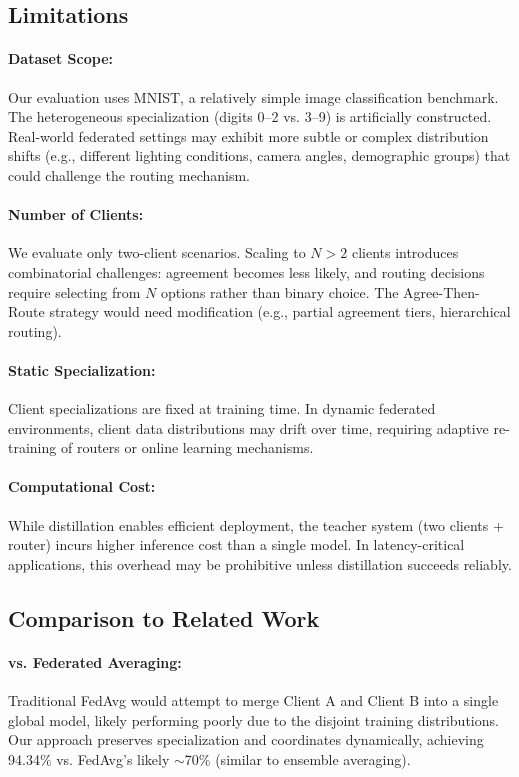 \documentclass[12pt]{article}
\begin{document}
\subsection{Limitations}

\paragraph{Dataset Scope:}
Our evaluation uses MNIST, a relatively simple image classification benchmark. The heterogeneous specialization (digits 0--2 vs. 3--9) is artificially constructed. Real-world federated settings may exhibit more subtle or complex distribution shifts (e.g., different lighting conditions, camera angles, demographic groups) that could challenge the routing mechanism.

\paragraph{Number of Clients:}
We evaluate only two-client scenarios. Scaling to $N > 2$ clients introduces combinatorial challenges: agreement becomes less likely, and routing decisions require selecting from $N$ options rather than binary choice. The Agree-Then-Route strategy would need modification (e.g., partial agreement tiers, hierarchical routing).

\paragraph{Static Specialization:}
Client specializations are fixed at training time. In dynamic federated environments, client data distributions may drift over time, requiring adaptive re-training of routers or online learning mechanisms.

\paragraph{Computational Cost:}
While distillation enables efficient deployment, the teacher system (two clients + router) incurs higher inference cost than a single model. In latency-critical applications, this overhead may be prohibitive unless distillation succeeds reliably.

\subsection{Comparison to Related Work}

\paragraph{vs. Federated Averaging:}
Traditional FedAvg would attempt to merge Client A and Client B into a single global model, likely performing poorly due to the disjoint training distributions. Our approach preserves specialization and coordinates dynamically, achieving 94.34\% vs. FedAvg's likely $\sim$70\% (similar to ensemble averaging).
\end{document}

